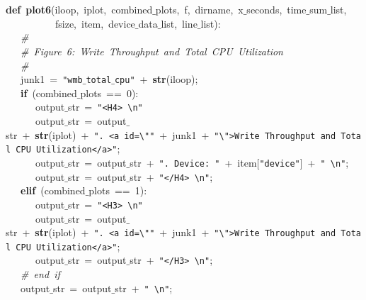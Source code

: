 \mbox{} \\
\mbox{} \\
\mbox{}\textbf{def}\ \textbf{plot6}(iloop,\ iplot,\ combined$\_$plots,\ f,\ dirname,\ x$\_$seconds,\ time$\_$sum$\_$list, \\
\mbox{}\ \ \ \ \ \ \ \ \ \ fsize,\ item,\ device$\_$data$\_$list,\ line$\_$list): \\
\mbox{}\ \ \ \textit{\#} \\
\mbox{}\ \ \ \textit{\#\ Figure\ 6:\ Write\ Throughput\ and\ Total\ CPU\ Utilization} \\
\mbox{}\ \ \ \textit{\#} \\
\mbox{}\ \ \ junk1\ =\ \texttt{"{}wmb$\_$total$\_$cpu"{}}\ +\ \textbf{str}(iloop); \\
\mbox{}\ \ \ \textbf{if}\ (combined$\_$plots\ ==\ 0): \\
\mbox{}\ \ \ \ \ \ output$\_$str\ =\ \texttt{"{}\textless{}H4\textgreater{}\ \textbackslash{}n"{}} \\
\mbox{}\ \ \ \ \ \ output$\_$str\ =\ output$\_$str\ +\ \textbf{str}(iplot)\ +\ \texttt{"{}.\ \textless{}a\ id=\textbackslash{}"{}"{}}\ +\ junk1\ +\ \texttt{"{}\textbackslash{}"{}\textgreater{}Write\ Throughput\ and\ Total\ CPU\ Utilization\textless{}/a\textgreater{}"{}}; \\
\mbox{}\ \ \ \ \ \ output$\_$str\ =\ output$\_$str\ +\ \texttt{"{}.\ Device:\ "{}}\ +\ item[\texttt{"{}device"{}}]\ +\ \texttt{"{}\ \textbackslash{}n"{}}; \\
\mbox{}\ \ \ \ \ \ output$\_$str\ =\ output$\_$str\ +\ \texttt{"{}\textless{}/H4\textgreater{}\ \textbackslash{}n"{}}; \\
\mbox{}\ \ \ \textbf{elif}\ (combined$\_$plots\ ==\ 1): \\
\mbox{}\ \ \ \ \ \ output$\_$str\ =\ \texttt{"{}\textless{}H3\textgreater{}\ \textbackslash{}n"{}} \\
\mbox{}\ \ \ \ \ \ output$\_$str\ =\ output$\_$str\ +\ \textbf{str}(iplot)\ +\ \texttt{"{}.\ \textless{}a\ id=\textbackslash{}"{}"{}}\ +\ junk1\ +\ \texttt{"{}\textbackslash{}"{}\textgreater{}Write\ Throughput\ and\ Total\ CPU\ Utilization\textless{}/a\textgreater{}"{}}; \\
\mbox{}\ \ \ \ \ \ output$\_$str\ =\ output$\_$str\ +\ \texttt{"{}\textless{}/H3\textgreater{}\ \textbackslash{}n"{}}; \\
\mbox{}\ \ \ \textit{\#\ end\ if} \\
\mbox{}\ \ \ output$\_$str\ =\ output$\_$str\ +\ \texttt{"{}\ \textbackslash{}n"{}}; \\
